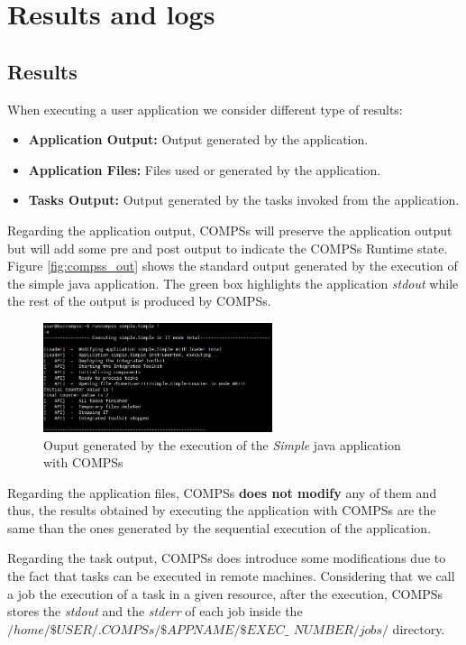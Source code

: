 \section{Results and logs}
\label{sec:Results_and_Logs}

\subsection{Results}
When executing a user application we consider different type of results:
\begin{itemize}
 \item \textbf{Application Output:} Output generated by the application.
 \item \textbf{Application Files:}  Files used or generated by the application.
 \item \textbf{Tasks Output:} Output generated by the tasks invoked from the application.
\end{itemize}

Regarding the application output, COMPSs will preserve the application output but will add some pre and post output to indicate
the COMPSs Runtime state. Figure \ref{fig:compss_out} shows the standard output generated by the execution of the 
simple java application. The green box highlights the application \textit{stdout} while the rest of the output is produced by COMPSs.  
\begin{figure}[h!]
  \centering
    \includegraphics[width=0.6\textwidth]{./Sections/3_Results_and_Logs/Figures/simple_java_stdout.jpeg}
    \caption{Ouput generated by the execution of the \textit{Simple} java application with COMPSs}
\end{figure}
\label{fig:compss_out}

Regarding the application files, COMPSs \textbf{does not modify} any of them and thus, the
results obtained by executing the application with COMPSs are the same than the ones generated by the sequential execution
of the application.

Regarding the task output, COMPSs does introduce some modifications due to the fact that tasks can be executed in remote
machines. Considering that we call a job the execution of a task in a given resource, after the execution, COMPSs stores 
the \textit{stdout} and the \textit{stderr} of each job inside the \textbf{$/home/\$USER/.COMPSs/\$APPNAME/\$EXEC\_$
$NUMBER/jobs/$}
directory.

